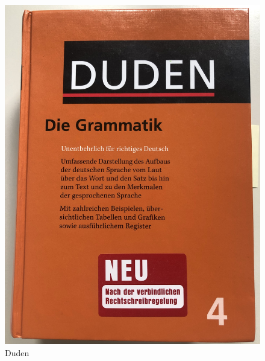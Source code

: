 \begin{frame}
\begin{columns}
\begin{column}{.4\textwidth}
\begin{figure}
	\centering
	\includegraphics[scale=.045]{material/DudenRichtigesDeutsch}
	\caption{Duden \citep{DudenGramm09d}}\label{Abb3}
\end{figure}

\end{column}

\end{columns}
	
\end{frame}


